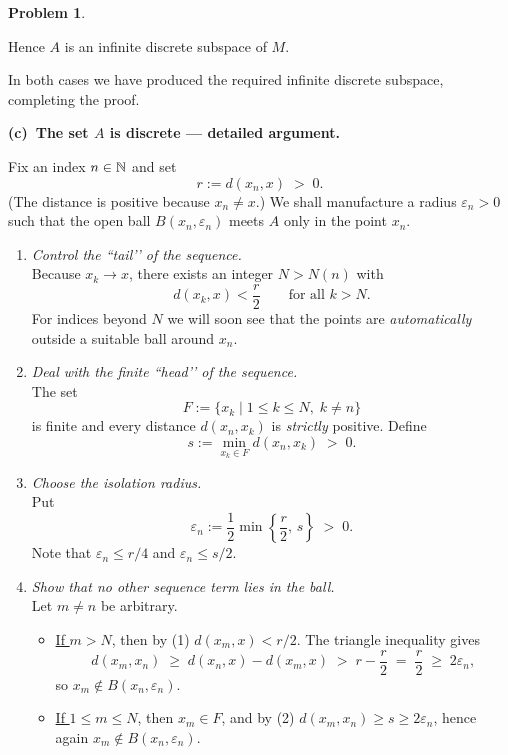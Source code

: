 \documentclass[12pt]{article}
\theoremstyle{definition} %
\newtheorem{problem}{Problem}
\theoremstyle{plain} %
\begin{document}
\begin{problem}
\begin{enumerate}
            Hence $A$ is an infinite discrete subspace of $M$.
  \end{enumerate}
  In both cases we have produced the required infinite discrete subspace,
  completing the proof.
\end{problem}

\medskip
\noindent\textbf{(c) \;The set $A$ is discrete — detailed argument.}

Fix an index $n\in\Bbb N$ and set 
\[
    r:=d(x_n,x)\;>\;0 .
\]
(The distance is positive because $x_n\neq x$.)  
We shall manufacture a radius $\varepsilon_n>0$ such that the open ball
\(B(x_n,\varepsilon_n)\) meets $A$ only in the point $x_n$.

\begin{enumerate}[label=\textbf{Step \arabic*:}, leftmargin=2.8em]
    \item \emph{Control the ``tail’’ of the sequence.}\\
          Because $x_k\to x$, there exists an integer $N>N(n)$ with
          \[
              d(x_k,x)<\frac{r}{2}\qquad\text{for all }k>N. \tag{1}
          \]
          For indices beyond $N$ we will soon see that the points are
          \emph{automatically} outside a suitable ball around $x_n$.

    \item \emph{Deal with the finite ``head’’ of the sequence.}\\
          The set
          \[
              F:=\{x_k\mid 1\le k\le N,\;k\neq n\}
          \]
          is finite and every distance $d(x_n,x_k)$ is \emph{strictly}
          positive.  Define
          \[
              s:=\min_{x_k\in F} d(x_n,x_k)\;>\;0. \tag{2}
          \]

    \item \emph{Choose the isolation radius.}\\
          Put
          \[
              \varepsilon_n:=\frac12\min\!\left\{\frac{r}{2},\,s\right\}\;>\;0. \tag{3}
          \]
          Note that $\varepsilon_n\le r/4$ and
          $\varepsilon_n\le s/2$.

    \item \emph{Show that no other sequence term lies in the ball.}\\
          Let $m\neq n$ be arbitrary.

          \begin{itemize}
              \item \underline{If $m>N$}, then by (1)
                    \(d(x_m,x)<r/2\).  The triangle inequality gives
                    \[
                        d(x_m,x_n)\;\ge\;
                        d(x_n,x)-d(x_m,x)\;>\;
                        r-\frac{r}{2}\;=\;\frac{r}{2}\;\ge\;2\varepsilon_n,
                    \]
                    so \(x_m\notin B(x_n,\varepsilon_n)\).

              \item \underline{If $1\le m\le N$}, then $x_m\in F$, and by (2)
                    \(d(x_m,x_n)\ge s\ge 2\varepsilon_n\),
                    hence again \(x_m\notin B(x_n,\varepsilon_n)\).
          \end{itemize}
\end{enumerate}
\end{document}
